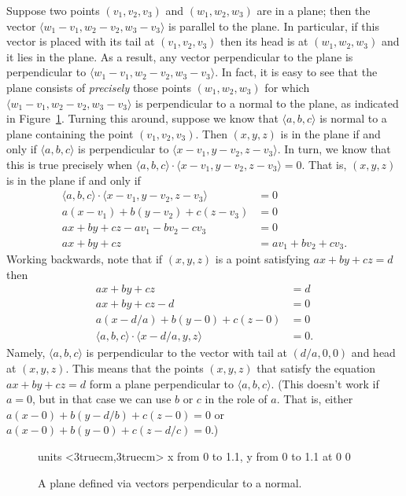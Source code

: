 Suppose two points $(v_1,v_2,v_3)$ and $(w_1,w_2,w_3)$ are in a plane;
then the vector $\langle w_1-v_1,w_2-v_2,w_3-v_3\rangle$ is parallel
to the plane. In particular, if this vector is placed with its tail at
$(v_1,v_2,v_3)$ then its head is at $(w_1,w_2,w_3)$ and it lies in the
plane. As a result, any vector perpendicular to the plane is
perpendicular to $\langle w_1-v_1,w_2-v_2,w_3-v_3\rangle$. In fact, it
is easy to see that the plane consists of \emph{precisely} those points
$(w_1,w_2,w_3)$ for which $\langle w_1-v_1,w_2-v_2,w_3-v_3\rangle$ is
perpendicular to a normal to the plane, as indicated in 
Figure~\ref{fig:plane defined via perp vectors}. Turning this around, suppose
we know that $\langle a,b,c\rangle$ is normal to a plane containing
the point $(v_1,v_2,v_3)$. Then $(x,y,z)$ is in the plane if and only
if $\langle a,b,c\rangle$ is perpendicular to $\langle
x-v_1,y-v_2,z-v_3\rangle$. In turn, we know that this is true
precisely when $\langle a,b,c\rangle\cdot\langle
x-v_1,y-v_2,z-v_3\rangle=0$. That is, $(x,y,z)$ is in the plane if and
only if
\begin{align*}
  \langle a,b,c\rangle\cdot\langle x-v_1,y-v_2,z-v_3\rangle&=0	\\
  a(x-v_1)+b(y-v_2)+c(z-v_3)&=0	\\
  ax+by+cz-av_1-bv_2-cv_3&=0	\\
  ax+by+cz&=av_1+bv_2+cv_3.
\end{align*}
Working backwards, note that if $(x,y,z)$ is a point satisfying 
$ax+by+cz=d$ then
\begin{align*}
  ax+by+cz&=d	\\
  ax+by+cz-d&=0	\\
  a(x-d/a)+b(y-0)+c(z-0)&=0	\\
  \langle a,b,c\rangle\cdot\langle x-d/a,y,z\rangle&=0.
\end{align*}
Namely, $\langle a,b,c\rangle$ is perpendicular to the vector with
tail at $(d/a,0,0)$ and head at $(x,y,z)$. This means that the points
$(x,y,z)$ that satisfy the equation $ax+by+cz=d$ form a plane
perpendicular to $\langle a,b,c\rangle$. (This doesn't
work if $a=0$, but in that case we can use $b$ or $c$ in the role of
$a$. That is, either $a(x-0)+b(y-d/b)+c(z-0)=0$ or 
$a(x-0)+b(y-0)+c(z-d/c)=0$.)

\begin{figure}[H]
\centerline{
\vbox{\beginpicture
\normalgraphs
\setcoordinatesystem units <3truecm,3truecm>
\setplotarea x from 0 to 1.1, y from 0 to 1.1
 at 0 0
\endpicture}}
\caption{A plane defined via vectors perpendicular to a normal. \label{fig:plane defined via perp vectors}}
\end{figure}


